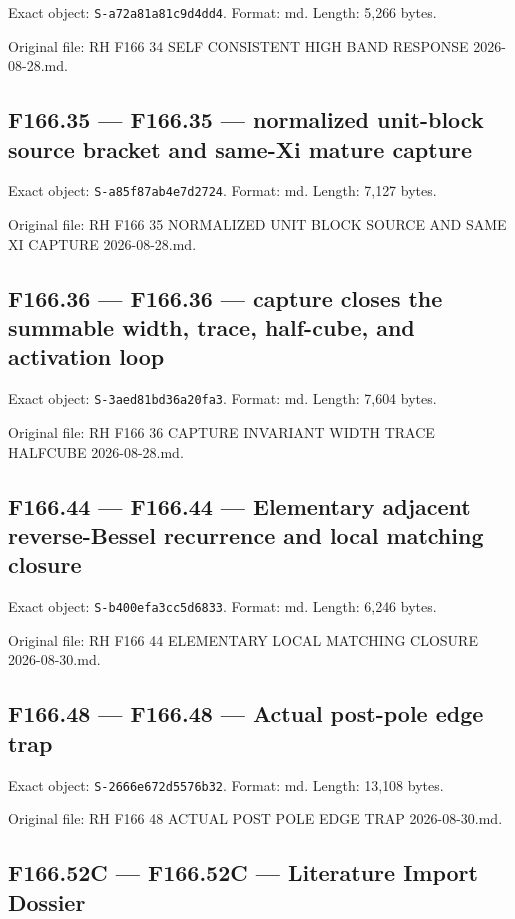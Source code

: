 \documentclass[
  10pt,
  a4paper,
  10pt,
  oneside,
  openany]{book}
\begin{document}
Exact object: \texttt{S-a72a81a81c9d4dd4}. Format: md. Length: 5,266
bytes.

Original file: RH F166 34 SELF CONSISTENT HIGH BAND RESPONSE
2026-08-28.md.

\subsection{F166.35 --- F166.35 --- normalized unit-block source bracket
and same-Xi mature capture}\label{source-f166-35}

Exact object: \texttt{S-a85f87ab4e7d2724}. Format: md. Length: 7,127
bytes.

Original file: RH F166 35 NORMALIZED UNIT BLOCK SOURCE AND SAME XI
CAPTURE 2026-08-28.md.

\subsection{F166.36 --- F166.36 --- capture closes the summable width,
trace, half-cube, and activation loop}\label{source-f166-36}

Exact object: \texttt{S-3aed81bd36a20fa3}. Format: md. Length: 7,604
bytes.

Original file: RH F166 36 CAPTURE INVARIANT WIDTH TRACE HALFCUBE
2026-08-28.md.

\subsection{F166.44 --- F166.44 --- Elementary adjacent reverse-Bessel
recurrence and local matching closure}\label{source-f166-44}

Exact object: \texttt{S-b400efa3cc5d6833}. Format: md. Length: 6,246
bytes.

Original file: RH F166 44 ELEMENTARY LOCAL MATCHING CLOSURE
2026-08-30.md.

\subsection{F166.48 --- F166.48 --- Actual post-pole edge
trap}\label{source-f166-48}

Exact object: \texttt{S-2666e672d5576b32}. Format: md. Length: 13,108
bytes.

Original file: RH F166 48 ACTUAL POST POLE EDGE TRAP 2026-08-30.md.

\subsection{F166.52C --- F166.52C --- Literature Import
Dossier}\label{source-f166-52c}
\end{document}
